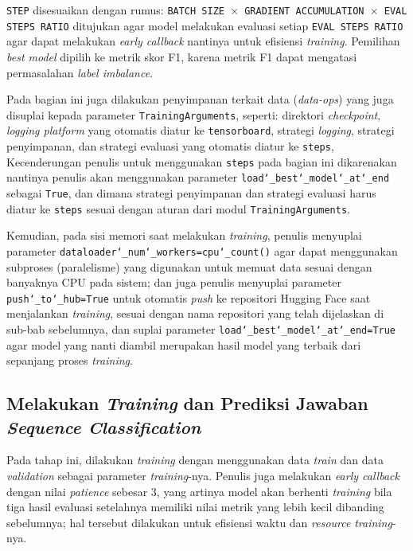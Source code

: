 \texttt{STEP} disesuaikan dengan rumus: \texttt{BATCH SIZE $\times$ GRADIENT ACCUMULATION $\times$ EVAL STEPS RATIO} ditujukan agar model melakukan evaluasi setiap \texttt{EVAL STEPS RATIO} agar dapat melakukan \emph{early callback} nantinya untuk efisiensi \emph{training}. Pemilihan \emph{best model} dipilih ke metrik skor F1, karena metrik F1 dapat mengatasi permasalahan \emph{label imbalance}.

Pada bagian ini juga dilakukan penyimpanan terkait data (\emph{data-ops}) yang juga disuplai kepada parameter \texttt{TrainingArguments}, seperti: direktori \emph{checkpoint}, \emph{logging platform} yang otomatis diatur ke \texttt{tensorboard}, strategi \emph{logging}, strategi penyimpanan, dan strategi evaluasi yang otomatis diatur ke \texttt{steps}, Kecenderungan penulis untuk menggunakan \texttt{steps} pada bagian ini dikarenakan nantinya penulis akan menggunakan parameter \texttt{load\char`_best\char`_model\char`_at\char`_end} sebagai \texttt{True}, dan dimana strategi penyimpanan dan strategi evaluasi harus diatur ke \texttt{steps} sesuai dengan aturan dari modul \texttt{TrainingArguments}.

Kemudian, pada sisi memori saat melakukan \emph{training}, penulis menyuplai parameter \texttt{dataloader\char`_num\char`_workers=cpu\char`_count()} agar dapat menggunakan subproses (paralelisme) yang digunakan untuk memuat data sesuai dengan banyaknya CPU pada sistem; dan juga penulis menyuplai parameter \texttt{push\char`_to\char`_hub=True} untuk otomatis \emph{push} ke repositori Hugging Face saat menjalankan \emph{training}, sesuai dengan nama repositori yang telah dijelaskan di sub-bab sebelumnya, dan suplai parameter \texttt{load\char`_best\char`_model\char`_at\char`_end=True} agar model yang nanti diambil merupakan hasil model yang terbaik dari sepanjang proses \emph{training}.

\subsection{Melakukan \emph{Training} dan Prediksi Jawaban \emph{Sequence Classification}}
\label{4.1.9}
Pada tahap ini, dilakukan \emph{training} dengan menggunakan data \emph{train} dan data \emph{validation} sebagai parameter \emph{training}-nya. Penulis juga melakukan \emph{early callback} dengan nilai \emph{patience} sebesar 3, yang artinya model akan berhenti \emph{training} bila tiga hasil evaluasi setelahnya memiliki nilai metrik yang lebih kecil dibanding sebelumnya; hal tersebut dilakukan untuk efisiensi waktu dan \emph{resource} \emph{training}-nya. 

